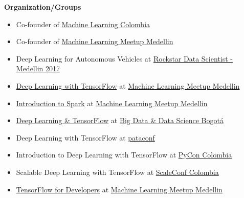 
\textbf{Organization/Groups}
\begin{itemize}
\tightlist
\item
  Co-founder of
  \href{https://www.facebook.com/groups/1766056600304468}{Machine
  Learning Colombia}
\item
  Co-founder of \href{https://www.meetup.com/es-ES/ml-medellin}{Machine
  Learning Meetup Medellin}
\end{itemize}

\begin{itemize}
\tightlist
\item
  Deep Learning for Autonomous Vehicles at \href{https://www.ticketcode.co/eventos/rockstar-s-data-scientist-2017}{Rockstar Data Scientist - Medellin 2017}
\item
  \href{https://www.meetup.com/es-ES/ml-medellin/events/231887878/}{Deep
  Learning with TensorFlow} at
  \href{https://www.meetup.com/es-ES/ml-medellin}{Machine Learning
  Meetup Medellin}
\item
  \href{https://www.meetup.com/es-ES/ml-medellin/events/232587669/}{Introduction
  to Spark} at \href{https://www.meetup.com/es-ES/ml-medellin}{Machine
  Learning Meetup Medellin}
\item
  \href{https://www.meetup.com/es-ES/Big-Data-Science-Bogota/events/233975872}{Deep
  Learning \& TensorFlow} at
  \href{https://www.meetup.com/es-ES/Big-Data-Science-Bogota/}{Big Data
  \& Data Science Bogotá}
\item
  Deep Learning with TensorFlow at \href{http://pataconf.com/}{pataconf}
\item
  Introduction to Deep Learning with TensorFlow at
  \href{http://www.pycon.co/}{PyCon Colombia}
\item
  Scalable Deep Learning with TensorFlow at
  \href{http://scaleconfco.com/}{ScaleConf Colombia}
\item
  \href{https://www.meetup.com/es-ES/ml-medellin/events/238072044/}{TensorFlow
  for Developers} at
  \href{https://www.meetup.com/es-ES/ml-medellin}{Machine Learning
  Meetup Medellin}
\end{itemize}

